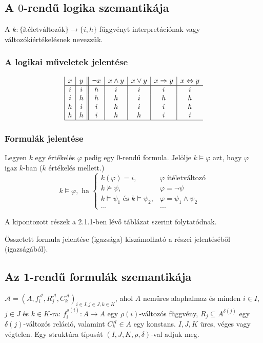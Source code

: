 \subsection{A $0$-rendű logika szemantikája}
\begin{defi}{A $k:\lbrace \text{ítéletváltozók} \rbrace \rightarrow \lbrace i, h \rbrace$} függvényt interpretációnak vagy változókiértékelésnek nevezzük.
\end{defi}
\subsubsection{A logikai műveletek jelentése}
\begin{displaymath}
\begin{array}{|c|c||c|c|c|c|c}
   x
 & y
 & \lnot{}x
 & x\land{}y
 & x\lor{}y
 & x\Rightarrow y
 & x\Leftrightarrow{}y \\
\hline
i & i & h & i & i & i & i \\
i & h & h & h & i & h & h \\
h & i & i & h & i & i & h \\
h & h & i & h & h & i & i \\
\hline
\end{array}
\end{displaymath}
\subsubsection{Formulák jelentése}
\begin{defi}{Legyen $k$ egy értékelés $\varphi$ pedig egy $0$-rendű formula. Jelölje $k \models \varphi$ azt, hogy $\varphi$ igaz $k$-ban ($k$ értékelés mellett.) 
$$k \models \varphi, \text{ ha } 
\begin{cases}
k(\varphi) = i, & \varphi \text{ ítéletváltozó} \\
k \not\models \psi, & \varphi = \lnot \psi \\
k \models \psi_1 \text{ és } k \models \psi_2, & \varphi = \psi_1 \land \psi_2 \\
... & ...
\end{cases}$$}
\end{defi}
A kipontozott részek a 2.1.1-ben lévő táblázat szerint folytatódnak.
\begin{megj}
Összetett formula jelentése (igazsága) kiszámolható a részei jelentéséből (igazságából).
\end{megj}
\subsection{Az 1-rendű formulák szemantikája}
\begin{defi}
$\mathcal{A} = (A,f_i^\mathcal{A},R_j^\mathcal{A},C_k^\mathcal{A})_{i \in I, j \in J, k \in K}$, ahol $A$ nemüres alaphalmaz és minden $i \in I$, $j \in J$ és $k \in K$-ra: $f_i^{\rho(i)} : A \rightarrow A$ egy $\rho(i)$-változós függvény, $R_j \subseteq A^{\delta(j)}$ egy $\delta(j)$-változós reláció, valamint $C^{\mathcal{A}}_k \in A$ egy konstans. $I, J, K$ üres, véges vagy végtelen. Egy struktúra típusát $(I,J,K,\rho,\delta)$-val adjuk meg.
\end{defi}

